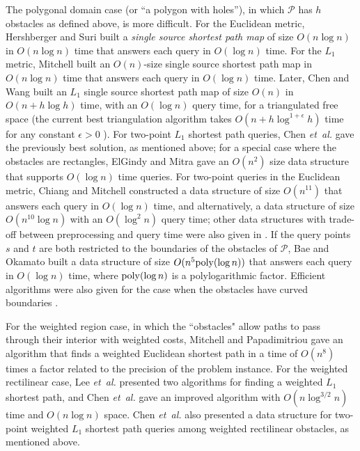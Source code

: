 \documentclass[english,runningheads,11pt]{llncs}
\def\etal{\textsl{et~al. }}
\def\calP{\mathcal{P}}
\begin{document}
The polygonal domain case (or ``a polygon with holes''), in which $\calP$ has $h$ obstacles as
defined above, is more difficult. For the Euclidean
metric, Hershberger and Suri \cite{ref:HershbergerAn99} built a {\em single source
shortest path map} of size $O(n\log n)$ in $O(n\log n)$ time that answers each
query in $O(\log n)$ time.
For the $L_1$ metric, Mitchell
\cite{ref:MitchellAn89,ref:MitchellL192} built an $O(n)$-size single source shortest
path map in $O(n\log n)$ time that answers each
query in $O(\log n)$ time. Later, Chen and Wang
\cite{ref:ChenA11ESA,ref:ChenCo12arXiv,ref:ChenL113STACS}
built an $L_1$ single source shortest path map of size $O(n)$ in $O(n+h\log h)$ time, with an
$O(\log n)$ query time, for a triangulated free
space (the current best triangulation algorithm takes
$O(n+h\log^{1+\epsilon}h)$ time for any constant $\epsilon>0$
\cite{ref:Bar-YehudaTr94}).
For two-point $L_1$ shortest path queries, Chen \etal \cite{ref:ChenSh00}
gave the previously best solution, as
mentioned above; for a special case where the obstacles are rectangles, ElGindy and Mitra \cite{ref:ElGindyOr94} gave an $O(n^2)$ size data structure that supports $O(\log n)$ time queries.
For two-point queries in the Euclidean metric,
Chiang and Mitchell \cite{ref:ChiangTw99}
constructed a data structure of size $O(n^{11})$ that answers each
query in $O(\log n)$ time, and alternatively, a data
structure of size $O(n^{10}\log n)$ with an $O(\log^2 n)$ query time; other data structures
with trade-off between preprocessing and query time were also given in
\cite{ref:ChiangTw99}. If the query points $s$ and $t$ are both restricted
to the boundaries of the obstacles of $\calP$, Bae and Okamato
\cite{ref:BaeQu12} built a data structure of size $O(n^5 {\rm poly}(\log n))$
that answers each query in $O(\log n)$ time, where
${\rm poly}(\log n)$ is a polylogarithmic factor.
Efficient algorithms were also given for the case when
the obstacles have curved boundaries
\cite{ref:ChenCo13,ref:ChenCo13SoCG,ref:ChewPl85,ref:HershbergerAn88,ref:HershbergerA13}.

For the weighted region case, in which
the ``obstacles" allow paths to pass through their
interior with weighted costs, Mitchell and Papadimitriou \cite{ref:MitchellTh91} gave an
algorithm that finds a weighted Euclidean shortest path in a time of $O(n^8)$
times a factor related to the precision of the problem instance.
For the weighted rectilinear case, Lee \etal \cite{ref:LeeSh91}
presented two algorithms for finding a weighted $L_1$
shortest path, and Chen \etal \cite{ref:ChenSh00} gave an improved algorithm with
$O(n\log ^{3/2}n)$ time and $O(n\log n)$ space. Chen
\etal \cite{ref:ChenSh00} also presented a data structure for
two-point weighted $L_1$ shortest path queries among
weighted rectilinear obstacles, as mentioned above.
\end{document}
